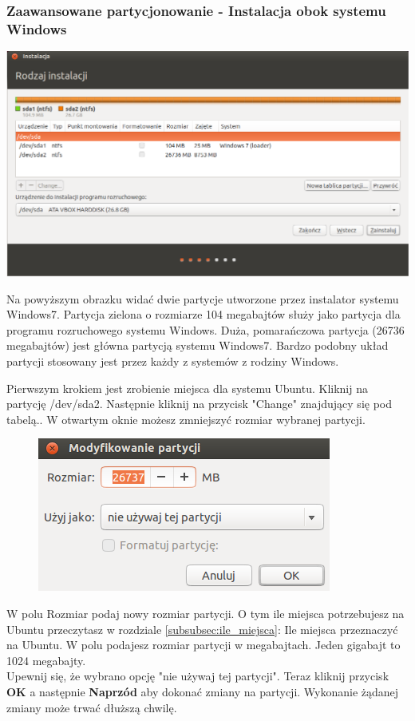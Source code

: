 \subsubsection{Zaawansowane partycjonowanie - Instalacja obok systemu Windows}
\begin{center}
	\includegraphics[scale=0.5]{images/instalator_partycjonowanie_gparted2_czysty.png}
\end{center}

Na powyższym obrazku widać dwie partycje utworzone przez instalator systemu Windows7. Partycja zielona o rozmiarze 104 megabajtów służy jako partycja dla programu rozruchowego systemu Windows. Duża, pomarańczowa partycja (26736 megabajtów) jest główna partycją systemu Windows7. Bardzo podobny układ partycji stosowany jest przez każdy z systemów z rodziny Windows.

Pierwszym krokiem jest zrobienie miejsca dla systemu Ubuntu. Kliknij na partycję /dev/sda2. Następnie kliknij na przycisk "Change" znajdujący się pod tabelą.. W otwartym oknie możesz zmniejszyć rozmiar wybranej partycji.
\clearpage

\begin{figure}
		\includegraphics[scale=1]{images/instalator_partycjonowanie_gparted_zmniejszenie_partycji_windows.png}
\end{figure}
W polu Rozmiar podaj nowy rozmiar partycji. O tym ile miejsca potrzebujesz na Ubuntu przeczytasz w rozdziale \ref{subsubsec:ile_miejsca}: Ile miejsca przeznaczyć na Ubuntu. W polu podajesz rozmiar partycji w megabajtach. Jeden gigabajt to 1024 megabajty.\\
Upewnij się, że wybrano opcję "nie używaj tej partycji". Teraz kliknij przycisk \textbf{OK} a następnie \textbf{Naprzód} aby dokonać zmiany na partycji. Wykonanie żądanej zmiany może trwać dłuższą chwilę.

